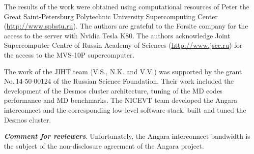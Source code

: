 \documentclass{llncs}
\begin{document}
The results of the work were obtained using computational resources of Peter the Great Saint-Petersburg Polytechnic University Supercomputing Center (\url{http://www.spbstu.ru}). The authors are grateful to the Forsite company for the access to the server with Nvidia Tesla K80. The authors acknowledge Joint Supercomputer Centre of Russin Academy of Sciences (\url{http://www.jscc.ru}) for the access to the MVS-10P supercomputer.

The work of the JIHT team (V.S., N.K. and V.V.) was supported by the grant No.\,14-50-00124 of the Russian Science Foundation. Their work included the development of the Desmos cluster architecture, tuning of the MD codes performance and MD benchmarks. The NICEVT team developed the Angara interconnect and the corresponding low-level software stack, built and tuned the Desmos cluster.

\textbf{\textit{Comment for reviewers}}. Unfortunately, the Angara interconnect bandwidth is the subject of the non-disclosure agreement of the Angara project.


\end{document}
